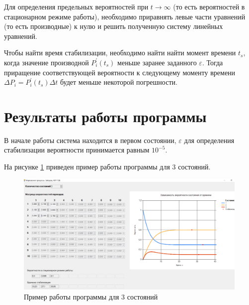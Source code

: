 \documentclass[14pt, a4paper]{extarticle}
\begin{document}
Для определения предельных вероятностей при $t \to \infty$ (то есть вероятностей в стационарном режиме работы), необходимо приравнять левые части уравнений (то есть производные) к нулю и решить полученную систему линейных уравнений. 

Чтобы найти время стабилизации, необходимо найти найти момент времени $t_s$, когда значение производной $P_{i}^{'}(t_s)$ меньше заранее заданного $\varepsilon$. Тогда приращение соответствующей вероятности к следующему моменту времени $\Delta P_{i} = P_{i}^{'}(t_s)\Delta t$ будет меньше некоторой погрешности.





\section{Результаты работы программы}

В начале работы система находится в первом состоянии, $\varepsilon$ для определения стабилизации вероятности принимается равным $10^{-5}$.



\newpage
На рисунке \ref{pic:1} приведен пример работы программы для 3 состояний.
\begin{figure}[h]
	\begin{center}
		{\includegraphics[scale=0.45]{pictures/1.png}
			\caption{Пример работы программы для 3 состояний}
			\label{pic:1}}
	\end{center}
\end{figure}
\end{document}
